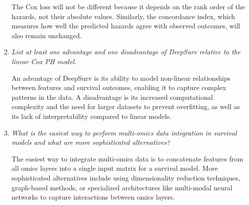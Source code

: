 \documentclass[a4paper]{article}
\begin{document}
\begin{enumerate}
    The Cox loss will not be different because it depends on the rank order of the hazards, not their absolute values.  
    Similarly, the concordance index, which measures how well the predicted hazards agree with observed outcomes, will also remain unchanged.  

    \item \textit{List at least one advantage and one disadvantage of DeepSurv relative to the linear Cox PH model.}  
    
    An advantage of DeepSurv is its ability to model non-linear relationships between features and survival outcomes, enabling it to capture complex patterns in the data.  
    A disadvantage is its increased computational complexity and the need for larger datasets to prevent overfitting, as
    well as its lack of interpretability compared to linear models.  

    \item \textit{What is the easiest way to perform multi-omics data integration in survival models and what are more sophisticated alternatives?}  
    
    The easiest way to integrate multi-omics data is to concatenate features from all omics layers into a single input matrix for a survival model.  
    More sophisticated alternatives include using dimensionality reduction techniques, graph-based methods, or specialized architectures like multi-modal neural networks to capture interactions between omics layers.

\end{enumerate}
\end{document}
